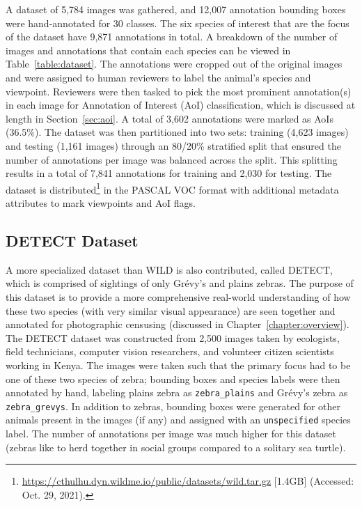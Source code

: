 A dataset of 5,784 images was gathered, and 12,007 annotation bounding boxes were hand-annotated for 30 classes.  The six species of interest that are the focus of the dataset have 9,871 annotations in total.  A breakdown of the number of images and annotations that contain each species can be viewed in Table~\ref{table:dataset}.  The annotations were cropped out of the original images and were assigned to human reviewers to label the animal's species and viewpoint.  Reviewers were then tasked to pick the most prominent annotation(s) in each image for Annotation of Interest (AoI) classification, which is discussed at length in Section~\ref{sec:aoi}.  A total of 3,602 annotations were marked as AoIs (36.5\%).  The dataset was then partitioned into two sets: training (4,623 images) and testing (1,161 images) through an 80/20\% stratified split that ensured the number of annotations per image was balanced across the split.  This splitting results in a total of 7,841 annotations for training and 2,030 for testing.  The dataset is distributed\footnote{\url{https://cthulhu.dyn.wildme.io/public/datasets/wild.tar.gz} [1.4GB] (Accessed: Oct. 29, 2021).} in the PASCAL VOC format with additional metadata attributes to mark viewpoints and AoI flags.

\subsection{DETECT Dataset}

A more specialized dataset than WILD is also contributed, called DETECT, which is comprised of sightings of only Gr\'evy's and plains zebras.  The purpose of this dataset is to provide a more comprehensive real-world understanding of how these two species (with very similar visual appearance) are seen together and annotated for photographic censusing (discussed in Chapter~\ref{chapter:overview}).  The DETECT dataset was constructed from 2,500 images taken by ecologists, field technicians, computer vision researchers, and volunteer citizen scientists~\cite{cohn_citizen_2008, silvertown_new_2009} working in Kenya.  The images were taken such that the primary focus had to be one of these two species of zebra; bounding boxes and species labels were then annotated by hand, labeling plains zebra as \texttt{zebra\_plains} and Gr\'evy's zebra as \texttt{zebra\_grevys}.  In addition to zebras, bounding boxes were generated for other animals present in the images (if any) and assigned with an \texttt{unspecified} species label.  The number of annotations per image was much higher for this dataset (zebras like to herd together in social groups compared to a solitary sea turtle).

